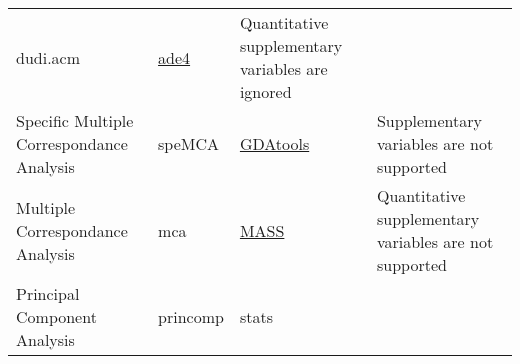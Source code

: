 \documentclass[]{article}
\begin{document}
\begin{longtable}[]{@{}llll@{}}
\begin{minipage}[t]{0.17\columnwidth}
dudi.acm\strut
\end{minipage} & \begin{minipage}[t]{0.14\columnwidth}\raggedright
\href{https://cran.r-project.org/package=ade4}{ade4}\strut
\end{minipage} & \begin{minipage}[t]{0.11\columnwidth}\raggedright
Quantitative supplementary variables are ignored\strut
\end{minipage}\tabularnewline
\begin{minipage}[t]{0.17\columnwidth}\raggedright
Specific Multiple Correspondance Analysis\strut
\end{minipage} & \begin{minipage}[t]{0.17\columnwidth}\raggedright
speMCA\strut
\end{minipage} & \begin{minipage}[t]{0.14\columnwidth}\raggedright
\href{https://cran.r-project.org/package=GDAtools}{GDAtools}\strut
\end{minipage} & \begin{minipage}[t]{0.11\columnwidth}\raggedright
Supplementary variables are not supported\strut
\end{minipage}\tabularnewline
\begin{minipage}[t]{0.17\columnwidth}\raggedright
Multiple Correspondance Analysis\strut
\end{minipage} & \begin{minipage}[t]{0.17\columnwidth}\raggedright
mca\strut
\end{minipage} & \begin{minipage}[t]{0.14\columnwidth}\raggedright
\href{https://cran.r-project.org/package=MASS}{MASS}\strut
\end{minipage} & \begin{minipage}[t]{0.11\columnwidth}\raggedright
Quantitative supplementary variables are not supported\strut
\end{minipage}\tabularnewline
\begin{minipage}[t]{0.17\columnwidth}\raggedright
Principal Component Analysis\strut
\end{minipage} & \begin{minipage}[t]{0.17\columnwidth}\raggedright
princomp\strut
\end{minipage} & \begin{minipage}[t]{0.14\columnwidth}\raggedright
stats\strut
\end{minipage} & \begin{minipage}[t]{0.11\columnwidth}\raggedright

\end{minipage}
\end{longtable}
\end{document}
